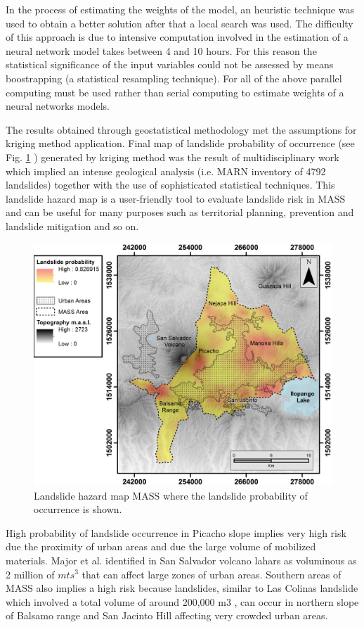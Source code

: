 \documentclass[11pt,twoside]{rmta2010esp}%
\begin{document}
In the process of estimating the weights of the model, an heuristic technique was used to obtain a better solution after that a local search was used. The difficulty of this approach is due to intensive computation involved in the estimation of a neural network model takes between 4 and 10 hours. For this reason the statistical significance of the input variables could not be assessed by means boostrapping  (a statistical resampling technique). For all of the above parallel computing must be used rather than serial computing to estimate weights of a neural networks models.



The results obtained through geostatistical methodology met the assumptions for kriging method application. Final map of landslide probability of occurrence (see Fig. \ref{fig:mass02} ) generated by kriging method was the result of multidisciplinary work which implied an intense geological analysis (i.e. MARN inventory of 4792 landslides) together with the use of sophisticated statistical techniques. This landslide hazard map is a user-friendly tool to evaluate landslide risk in MASS and can be useful for many purposes such as territorial planning, prevention and landslide mitigation and so on. 
\begin{center}
  \begin{figure}
   \centering
   \includegraphics[scale=0.73]{MASS_mapa_2}
   \caption{\small{Landslide hazard map MASS where the landslide probability of occurrence is shown.}}
   \label{fig:mass02}
  \end{figure}
 \end{center}
High probability of landslide occurrence in Picacho slope implies very high risk due the proximity of urban areas and due the large volume of mobilized materials. Major et al.\cite{major2004} identified in San Salvador volcano lahars as voluminous as 2 million of $mts^{3}$ that can affect large zones of urban areas. Southern areas of MASS also implies a high risk because landslides, similar to Las Colinas landslide which involved a total volume of around 200,000 m3 \cite{evans}, can occur in northern slope of Balsamo range and San Jacinto Hill affecting very crowded urban areas.
\end{document}
